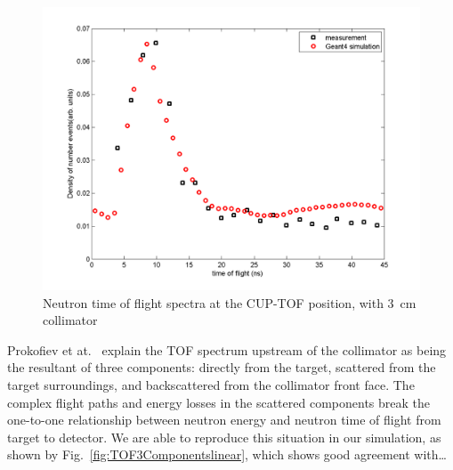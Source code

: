 \documentclass[11pt,a4paper]{IEEEtran}
\let\MYoriglatexcaption\caption
\renewcommand{\caption}[2][\relax]{\MYoriglatexcaption[#2]{#2}}
\begin{document}
\begin{figure}[t]
    \includegraphics[width=\columnwidth]{CUPTOFtofspectraRADECS.png}
    \caption{
        Neutron time of flight spectra at the CUP-TOF position, with \SI{3}{\cm} collimator
        }
    \label{fig:TOFSpectra}
\end{figure}

Prokofiev et at.~\cite{Prokofiev14} explain the TOF spectrum upstream of the collimator as being the resultant of three components: directly from the target, scattered from the target surroundings, and backscattered from the collimator front face.
The complex flight paths and energy losses in the scattered components break the one-to-one relationship between neutron energy and neutron time of flight from target to detector.
We are able to reproduce this situation in our simulation, as shown by Fig.~\ref{fig:TOF3Componentslinear}, which shows good agreement with\ldots
{}
\end{document}

